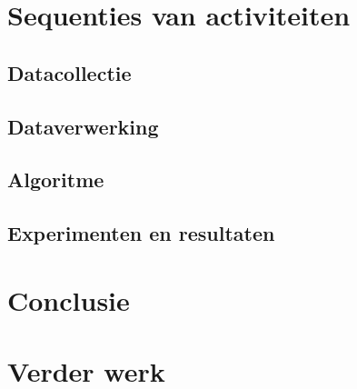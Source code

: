 \documentclass{article}
\begin{document}
\section{Sequenties van activiteiten}


\subsection{Datacollectie}


\subsection{Dataverwerking}


\subsection{Algoritme}


\subsection{Experimenten en resultaten}


\section{Conclusie}


\section{Verder werk}






% 
% 
\end{document}
